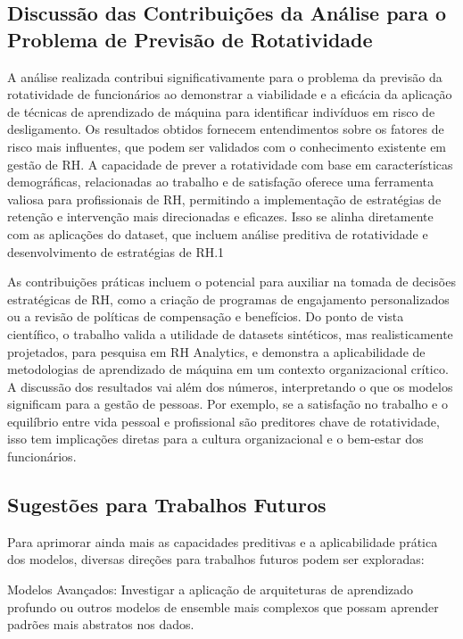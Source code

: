\documentclass[sigconf]{acmart}
\begin{document}
\subsection{Discussão das Contribuições da Análise para o Problema de Previsão de Rotatividade}
A análise realizada contribui significativamente para o problema da previsão da rotatividade de funcionários ao demonstrar a viabilidade e a eficácia da aplicação de técnicas de aprendizado de máquina para identificar indivíduos em risco de desligamento. Os resultados obtidos fornecem entendimentos sobre os fatores de risco mais influentes, que podem ser validados com o conhecimento existente em gestão de RH. A capacidade de prever a rotatividade com base em características demográficas, relacionadas ao trabalho e de satisfação oferece uma ferramenta valiosa para profissionais de RH, permitindo a implementação de estratégias de retenção e intervenção mais direcionadas e eficazes. Isso se alinha diretamente com as aplicações do dataset, que incluem análise preditiva de rotatividade e desenvolvimento de estratégias de RH.1

As contribuições práticas incluem o potencial para auxiliar na tomada de decisões estratégicas de RH, como a criação de programas de engajamento personalizados ou a revisão de políticas de compensação e benefícios. Do ponto de vista científico, o trabalho valida a utilidade de datasets sintéticos, mas realisticamente projetados, para pesquisa em RH Analytics, e demonstra a aplicabilidade de metodologias de aprendizado de máquina em um contexto organizacional crítico. A discussão dos resultados vai além dos números, interpretando o que os modelos significam para a gestão de pessoas. Por exemplo, se a satisfação no trabalho e o equilíbrio entre vida pessoal e profissional são preditores chave de rotatividade, isso tem implicações diretas para a cultura organizacional e o bem-estar dos funcionários.

\subsection{Sugestões para Trabalhos Futuros}
Para aprimorar ainda mais as capacidades preditivas e a aplicabilidade prática dos modelos, diversas direções para trabalhos futuros podem ser exploradas:

Modelos Avançados: Investigar a aplicação de arquiteturas de aprendizado profundo ou outros modelos de ensemble mais complexos que possam aprender padrões mais abstratos nos dados.
\end{document}
